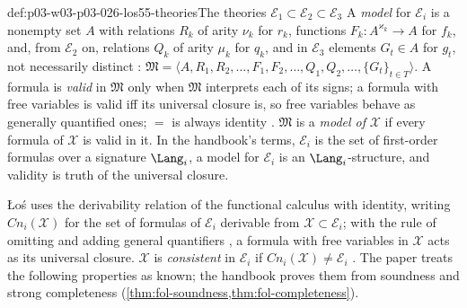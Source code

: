 \begin{hbconvention}{def:p03-w03-p03-026-los55-theories}{The theories \(\mathcal E_1\subset\mathcal E_2\subset\mathcal E_3\)}
A \emph{model} for \(\mathcal E_i\) is a nonempty set \(A\) with relations
\(R_k\) of arity \(\nu_k\) for \(r_k\), functions \(F_k\colon
A^{\varkappa_k}\to A\) for \(f_k\), and, from \(\mathcal E_2\) on, relations
\(Q_k\) of arity \(\mu_k\) for \(q_k\), and in \(\mathcal E_3\) elements
\(G_t\in A\) for \(g_t\), not necessarily distinct \cite[p.~41]{Los1955}:
\(\mathfrak M=\langle A,R_1,R_2,\ldots,F_1,F_2,\ldots,Q_1,Q_2,\ldots,\{G_t\}_{t\in T}\rangle\).
A formula is \emph{valid} in \(\mathfrak M\) only when \(\mathfrak M\)
interprets each of its signs; a formula with free variables is valid iff its
universal closure is, so free variables behave as generally quantified ones;
\(=\) is always identity \cite[p.~42]{Los1955}.  \(\mathfrak M\) is a
\emph{model of} \(\mathcal X\) if every formula of \(\mathcal X\) is valid in
it.  In the handbook's terms, \(\mathcal E_i\) is the set of first-order
formulas over a signature \(\Lang_i\), a model for \(\mathcal E_i\) is an
\(\Lang_i\)-structure, and validity is truth of the universal closure.
\end{hbconvention}

\L o\'s uses the derivability relation of the functional calculus with
identity, writing \(\mathit{Cn}_i(\mathcal X)\) for the set of formulas of
\(\mathcal E_i\) derivable from \(\mathcal X\subset\mathcal E_i\); with the
rule of omitting and adding general quantifiers \cite[pp.~39--42]{Los1955},
a formula with free variables in \(\mathcal X\) acts as its universal
closure.  \(\mathcal X\) is \emph{consistent} in \(\mathcal E_i\) if
\(\mathit{Cn}_i(\mathcal X)\neq\mathcal E_i\) \cite[p.~41]{Los1955}.  The
paper treats the following properties as known; the handbook proves them
from soundness and strong completeness
(\cref{thm:fol-soundness,thm:fol-completeness}).

